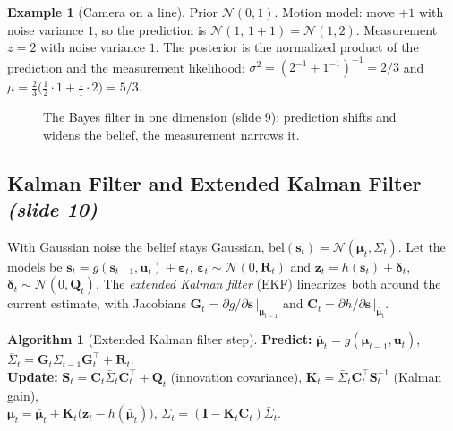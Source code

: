 \documentclass[11pt,a4paper]{article}
\newcommand{\slrs}[1]{\texorpdfstring{\emph{(slide #1)}}{(slide #1)}}
\newcommand{\bz}{\bm{z}}
\newcommand{\bu}{\mathbf{u}}
\newcommand{\bs}{\mathbf{s}}
\newcommand{\bK}{\mathbf{K}}
\newcommand{\bS}{\mathbf{S}}
\newcommand{\bG}{\mathbf{G}}
\newcommand{\bC}{\mathbf{C}}
\newcommand{\bI}{\mathbf{I}}
\newcommand{\N}{\mathcal{N}}
\theoremstyle{definition}
\newtheorem{example}[definition]{Example}
\newtheorem{algorithm}{Algorithm}[section]
\theoremstyle{plain}
\theoremstyle{remark}
\begin{document}
\begin{example}[Camera on a line]\label{ex:line}
Prior $\N(0,1)$. Motion model: move $+1$ with noise variance $1$, so the prediction is $\N(1,\,1+1)=\N(1,2)$. Measurement $z=2$ with noise variance $1$. The posterior is the normalized product of the prediction and the measurement likelihood: $\sigma^2=(2^{-1}+1^{-1})^{-1}=2/3$ and $\mu=\tfrac{2}{3}\big(\tfrac{1}{2}\cdot 1+\tfrac{1}{1}\cdot 2\big)=5/3$.
\end{example}
\begin{figure}[htbp]\centering
{}
\caption{The Bayes filter in one dimension (slide 9): prediction shifts and widens the belief, the measurement narrows it.}
\end{figure}

\subsection{Kalman Filter and Extended Kalman Filter \slrs{10}}
With Gaussian noise the belief stays Gaussian, $\mathrm{bel}(\bs_t)=\N(\boldsymbol\mu_t,\Sigma_t)$. Let the models be $\bs_t=g(\bs_{t-1},\bu_t)+\boldsymbol\varepsilon_t$, $\boldsymbol\varepsilon_t\sim\N(0,\mathbf R_t)$ and $\bz_t=h(\bs_t)+\boldsymbol\delta_t$, $\boldsymbol\delta_t\sim\N(0,\mathbf Q_t)$. The \emph{extended Kalman filter} (EKF) linearizes both around the current estimate, with Jacobians $\bG_t=\partial g/\partial\bs\,|_{\boldsymbol\mu_{t-1}}$ and $\bC_t=\partial h/\partial\bs\,|_{\bar{\boldsymbol\mu}_t}$.

\begin{algorithm}[Extended Kalman filter step]\label{alg:ekf}
\textbf{Predict:} $\bar{\boldsymbol\mu}_t=g(\boldsymbol\mu_{t-1},\bu_t)$, \quad $\bar\Sigma_t=\bG_t\Sigma_{t-1}\bG_t^\top+\mathbf R_t$.\\[3pt]
\textbf{Update:} $\bS_t=\bC_t\bar\Sigma_t\bC_t^\top+\mathbf Q_t$ (innovation covariance), \quad $\bK_t=\bar\Sigma_t\bC_t^\top\bS_t^{-1}$ (Kalman gain),\\
$\boldsymbol\mu_t=\bar{\boldsymbol\mu}_t+\bK_t\big(\bz_t-h(\bar{\boldsymbol\mu}_t)\big)$, \quad $\Sigma_t=(\bI-\bK_t\bC_t)\bar\Sigma_t$.
\end{algorithm}
\end{document}

